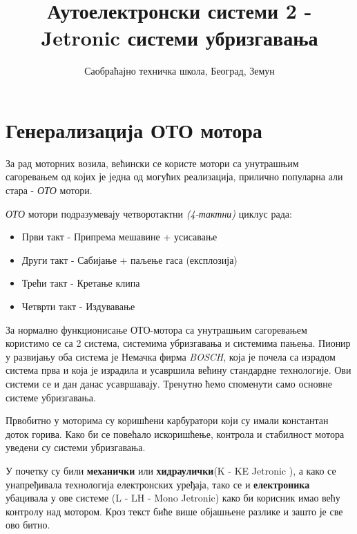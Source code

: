 \documentclass{report}
\title{Аутоелектронски системи 2 - Jetronic системи убризгавања}
\author{Саобраћајно техничка школа, Београд, Земун}
\begin{document}
\maketitle

\tableofcontents
\newpage


\chapter{Генерализација ОТО мотора} 

За рад моторних возила, већински се користе мотори са унутрашњим сагоревањем од којих је 
једна од могућих реализација, прилично популарна али стара - \textit{ОТО} мотори.

\textit{ОТО} мотори подразумевају четворотактни \textit{(4-тактни)} циклус рада:

\begin{itemize}      %
    \item Први такт - Припрема мешавине + усисавање
    \item Други такт - Сабијање + паљење гаса (експлозија)
    \item Трећи такт - Кретање клипа
    \item Четврти такт - Издувавање
\end{itemize}

За нормално функционисање ОТО-мотора са унутрашњим сагоревањем користимо
се са 2 система, системима убризгавања и системима пањења. Пионир у развијању оба система 
је Немачка фирма \textit{BOSCH}, која је почела са израдом система прва и
која је израдила и усавршила већину стандардне технологије. Ови системи се и дан 
данас усавршавају.
Тренутно ћемо 
споменути само основне системе убризгавања. 

Првобитно у моторима су коришћени карбуратори који су имали константан доток горива. 
Како би се повећало искоришћење, контрола и стабилност мотора уведени су системи убризгавања.

У почетку су били \textbf{механички} или \textbf{хидраулички}(K - KE Jetronic ), а како се унапређивала технологија 
електронских уређаја, тако се и \textbf{електроника} убацивала у ове системе (L - LH - Mono Jetronic) како би корисник
имао већу контролу над мотором. Кроз текст биће више објашњене разлике и зашто је све 
ово битно.
\end{document}
